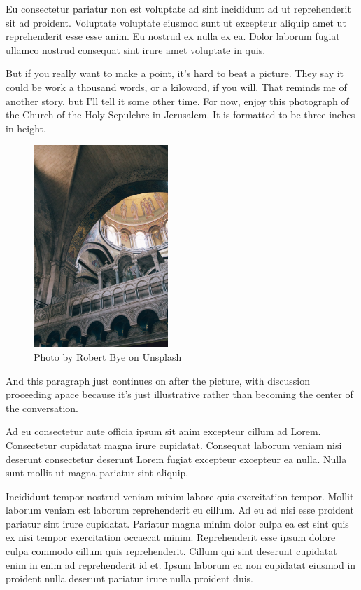 \documentclass[
    12pt,
    letterpaper,
    oneside,
    noraggedright
]{turabian-researchpaper}
\begin{document}
Eu consectetur pariatur non est voluptate ad sint incididunt ad ut
reprehenderit sit ad proident. Voluptate voluptate eiusmod sunt ut
excepteur aliquip amet ut reprehenderit esse esse anim. Eu nostrud ex
nulla ex ea. Dolor laborum fugiat ullamco nostrud consequat sint irure
amet voluptate in quis.

But if you really want to make a point, it's hard to beat a picture.
They say it could be work a thousand words, or a kiloword, if you will.
That reminds me of another story, but I'll tell it some other time. For
now, enjoy this photograph of the Church of the Holy Sepulchre in
Jerusalem. It is formatted to be three inches in height.

\begin{figure}
\centering
\includegraphics[width=\textwidth,height=3in]{./images/robert-bye-W4V4vtq36NU-unsplash.jpg}
\caption{Photo by
\href{https://unsplash.com/@robertbye?utm_source=unsplash\&utm_medium=referral\&utm_content=creditCopyText}{Robert
Bye} on
\href{https://unsplash.com/s/photos/jerusalem?utm_source=unsplash\&utm_medium=referral\&utm_content=creditCopyText}{Unsplash}}
\end{figure}

\noindent And this paragraph just continues on after the picture, with
discussion proceeding apace because it's just illustrative rather than
becoming the center of the conversation.

Ad eu consectetur aute officia ipsum sit anim excepteur cillum ad Lorem.
Consectetur cupidatat magna irure cupidatat. Consequat laborum veniam
nisi deserunt consectetur deserunt Lorem fugiat excepteur excepteur ea
nulla. Nulla sunt mollit ut magna pariatur sint aliquip.

Incididunt tempor nostrud veniam minim labore quis exercitation tempor.
Mollit laborum veniam est laborum reprehenderit eu cillum. Ad eu ad nisi
esse proident pariatur sint irure cupidatat. Pariatur magna minim dolor
culpa ea est sint quis ex nisi tempor exercitation occaecat minim.
Reprehenderit esse ipsum dolore culpa commodo cillum quis reprehenderit.
Cillum qui sint deserunt cupidatat enim in enim ad reprehenderit id et.
Ipsum laborum ea non cupidatat eiusmod in proident nulla deserunt
pariatur irure nulla proident duis.
\end{document}
